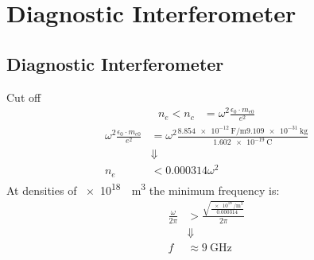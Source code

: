 \documentclass[hyperref={colorlinks=true,urlcolor=blue,linkcolor=.},aspectratio=1610,mathserif]{beamer}
\begin{document}
\section{Diagnostic Interferometer}
\subsection{Diagnostic Interferometer}
\begin{frame}{Cut off}
	\begin{align}
		n_e < n_c & = \omega^2\frac{\epsilon_0\cdot m_{e0}}{e^2}
	\end{align}
	\begin{align}
		\omega^2\frac{\epsilon_0\cdot m_{e0}}{e^2} & = \omega^2\frac{\SI{8.854e-12}{\farad\per\meter}\SI{9.109e-31}{\kilo\gram}}{\SI{1.602e-19}{\coulomb}} \\
		                                           & \Downarrow\nonumber                                                                                   \\
		n_e                                        & < 0.000314\omega^2
	\end{align}
	At densities of \SI{e18}{\per\meter\cubed} the minimum frequency is:
	\begin{align}
		\frac{\omega}{2\pi} & > \frac{\sqrt{\frac{\SI{e18}{\per\meter\cubed}}{0.000314}}}{2\pi} \\
		                    & \Downarrow\nonumber                                               \\
		f                   & \approx \SI{9}{\giga\hertz}
	\end{align}
\end{frame}
\end{document}
